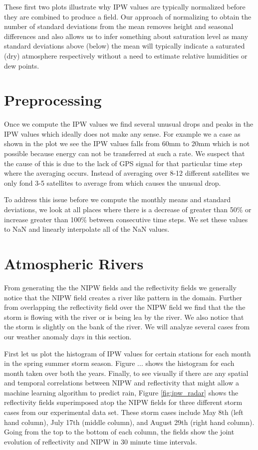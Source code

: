 \documentclass[proposal]{umassthesis}
\begin{document}
These first two plots illustrate why IPW values are typically normalized before they are combined to produce a field. Our approach of normalizing to obtain the number of standard deviations from the mean removes height and seasonal differences and also allows us to infer something about saturation level as many standard deviations above (below) the mean will typically indicate a saturated (dry) atmosphere respectively without a need to estimate relative humidities or dew points.

\section{Preprocessing}

Once we compute the IPW values we find several unusual drops and peaks in the IPW values which ideally does not make any sense. For example we a case as shown in the plot we see the IPW values falls from 60mm to 20mm which is not possible because energy can not be transferred at such a rate. We suspect that the cause of this is due to the lack of GPS signal for that particular time step where the averaging occurs. Instead of averaging over 8-12 different satellites we only fond 3-5 satellites to average from which causes the unusual drop.

To address this issue before we compute the monthly means and standard deviations, we look at all places where there is a decrease of greater than 50\% or increase greater than 100\% between consecutive time steps. We set these values to NaN and linearly interpolate all of the NaN values. 

\section{Atmospheric Rivers}

From generating the the NIPW fields and the reflectivity fields we generally notice that the NIPW field creates a river like pattern in the domain. Further from overlapping the reflectivity field over the NIPW field we find that the the storm is flowing with the river or is being lea by the river. We also notice that the storm is slightly on the bank of the river. We will analyze several cases from our weather anomaly days in this section. 

First let us plot the histogram of IPW values for certain stations for each month in the spring summer storm season. Figure ... shows the histogram for each month taken over both the years. 
Finally, to see visually if there are any spatial and temporal correlations between NIPW and reflectivity that might allow a machine learning algorithm to predict rain, Figure \ref{fig:ipw_radar} shows the reflectivity fields superimposed atop the NIPW fields for three different storm cases from our experimental data set. These storm cases include May 8th (left hand column), July 17th (middle column), and August 29th (right hand column). Going from the top to the bottom of each column, the fields show the joint evolution of reflectivity and NIPW in 30 minute time intervals.
\end{document}
